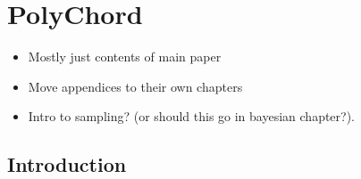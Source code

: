 \chapter{PolyChord}
\label{chap:pc}

\begin{itemize}
  \item Mostly just contents of main paper
  \item Move appendices to their own chapters
  \item Intro to sampling? (or should this go in bayesian chapter?).
\end{itemize}

\section{Introduction}
\label{sec:intro:pc}
